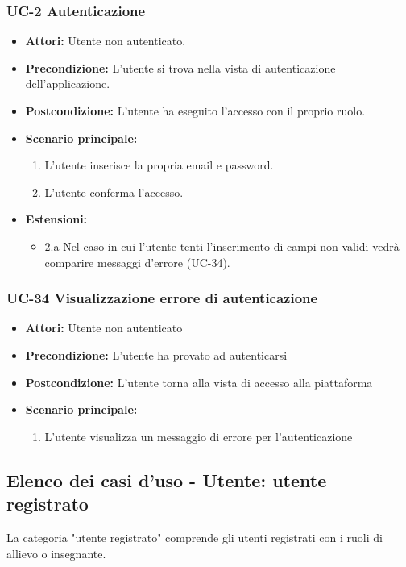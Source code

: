 \subsubsection{UC-2 Autenticazione}
		\begin{itemize}
			\item \textbf{Attori:} Utente non autenticato.
			\item \textbf{Precondizione:} L'utente si trova nella vista di autenticazione dell'applicazione.
			\item \textbf{Postcondizione:} L'utente ha eseguito l'accesso con il proprio ruolo.
			\item \textbf{Scenario principale:}
				\begin{enumerate}
					\item L'utente inserisce la propria email e password.
					\item L'utente conferma l'accesso.
				\end{enumerate}
				\item \textbf{Estensioni:}
				\begin{itemize}
					\item 2.a Nel caso in cui l'utente tenti l'inserimento di campi non validi vedrà comparire messaggi d'errore (UC-34).
				\end{itemize}
		\end{itemize}
		
\subsubsection{UC-34 Visualizzazione errore di autenticazione}
		\begin{itemize}
			\item \textbf{Attori:} Utente non autenticato
			\item \textbf{Precondizione:} L'utente ha provato ad autenticarsi
			\item \textbf{Postcondizione:} L'utente torna alla vista di accesso alla piattaforma
			\item \textbf{Scenario principale:}
			\begin{enumerate}
				\item L'utente visualizza un messaggio di errore per l'autenticazione
			\end{enumerate}
		\end{itemize}
		
\subsection{Elenco dei casi d'uso - Utente: utente registrato}	
La categoria "utente registrato" comprende gli utenti registrati con i ruoli di allievo o insegnante.	
